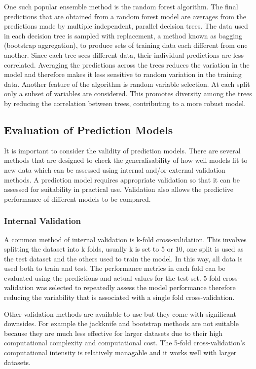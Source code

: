 \documentclass[11pt]{article}
\begin{document}
One such popular ensemble method is the random forest algorithm\cite{Biau2015}. The final predictions that are obtained from a random forest model are averages from the predictions made by multiple independent, parallel decision trees\cite{Breiman2001}. The data used in each decision tree is sampled with replacement, a method known as bagging (bootstrap aggregation), to produce sets of training data each different from one another. Since each tree sees different data, their individual predictions are less correlated. Averaging the predictions across the trees reduces the variation in the model and therefore makes it less sensitive to random variation in the training data. Another feature of the algorithm is random variable selection. At each split only a subset of variables are considered. This promotes diversity among the trees by reducing the correlation between trees\cite{Chen2012}, contributing to a more robust model.

\subsection{Evaluation of Prediction Models}
It is important to consider the validity of prediction models. There are several methods that are designed to check the generalisability of how well models fit to new data which can be assessed using internal and/or external validation methods\cite{Jiang2017}. A prediction model requires appropriate validation so that it can be assessed for suitability in practical use. Validation also allows the predictive performance of different models to be compared. 
 
\subsubsection{Internal Validation}
A common method of internal validation is k-fold cross-validation\cite{Rodrguez2013}. This involves splitting the dataset into k folds, usually k is set to 5 or 10, one split is used as the test dataset and the others used to train the model. In this way, all data is used both to train and test. The performance metrics in each fold can be evaluated using the predictions and actual values for the test set. 5-fold cross-validation was selected to repeatedly assess the model performance therefore reducing the variability that is associated with a single fold cross-validation\cite{Varma2006}. 

Other validation methods are available to use but they come with significant downsides. For example the jackknife and bootstrap methods are not suitable because they are much less effective for larger datasets due to their high computational complexity and computational cost\cite{Kleiner2014}\cite{Withers2009}. The 5-fold cross-validation's computational intensity is relatively managable and it works well with larger datasets.
\end{document}

